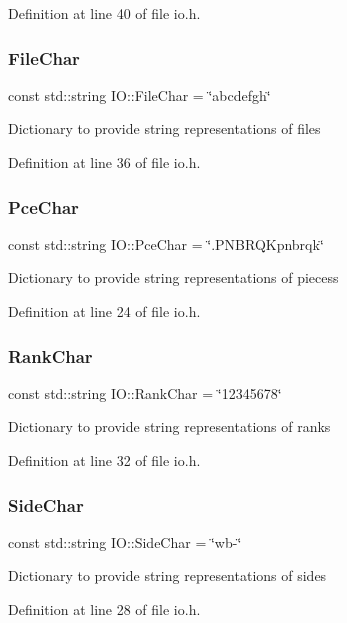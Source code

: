 Definition at line 40 of file io.\+h.

\mbox{\label{namespaceIO_af411d58290cad5da877276bff7704388}} 
\subsubsection{\texorpdfstring{File\+Char}{FileChar}}
{\footnotesize\ttfamily const std\+::string I\+O\+::\+File\+Char = \char`\"{}abcdefgh\char`\"{}}

Dictionary to provide string representations of files 

Definition at line 36 of file io.\+h.

\mbox{\label{namespaceIO_a1c70218e9ea5ec5ff1a2a3e486dc1c9d}} 
\subsubsection{\texorpdfstring{Pce\+Char}{PceChar}}
{\footnotesize\ttfamily const std\+::string I\+O\+::\+Pce\+Char = \char`\"{}.P\+N\+B\+R\+Q\+Kpnbrqk\char`\"{}}

Dictionary to provide string representations of piecess 

Definition at line 24 of file io.\+h.

\mbox{\label{namespaceIO_aa43c5eefed9ad388801e187fb1c4b9f7}} 
\subsubsection{\texorpdfstring{Rank\+Char}{RankChar}}
{\footnotesize\ttfamily const std\+::string I\+O\+::\+Rank\+Char = \char`\"{}12345678\char`\"{}}

Dictionary to provide string representations of ranks 

Definition at line 32 of file io.\+h.

\mbox{\label{namespaceIO_ac0e91e487904b7ef2a84da82dd8163b1}} 
\subsubsection{\texorpdfstring{Side\+Char}{SideChar}}
{\footnotesize\ttfamily const std\+::string I\+O\+::\+Side\+Char = \char`\"{}wb-\/\char`\"{}}

Dictionary to provide string representations of sides 

Definition at line 28 of file io.\+h.

